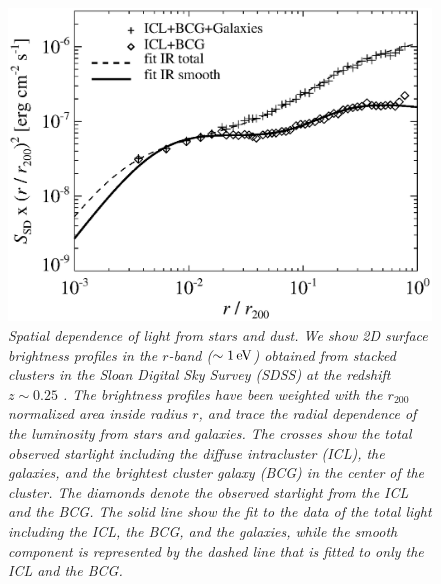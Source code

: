 \documentclass[10pt,aps,pra,reprint,amsmath,amsfonts,amssymb,showpacs]{revtex4-1}
\newcommand{\ev}{\rm{eV}}
\newcommand{\rvir}{r_{200}}
\begin{document}
\begin{figure}%
 \includegraphics[width=0.99\columnwidth]{figures/SB.photon.eps}
\caption{\it Spatial dependence of light from stars and dust. We show
  2D surface brightness profiles in the $r$-band ($\sim 1\,\ev$)
  obtained from stacked clusters in the Sloan Digital Sky Survey
  (SDSS) at the redshift $z \sim 0.25$ \cite{2005MNRAS.358..949Z}. The
  brightness profiles have been weighted with the $\rvir$ normalized
  area inside radius $r$, and trace the radial dependence of the
  luminosity from stars and galaxies. The crosses show the total
  observed starlight including the diffuse intracluster (ICL), the
  galaxies, and the brightest cluster galaxy (BCG) in the center of
  the cluster. The diamonds denote the observed starlight from the
  ICL and the BCG. The solid line show the fit to the data of the
  total light including the ICL, the BCG, and the galaxies, while the
  smooth component is represented by the dashed line that is fitted to
  only the ICL and the BCG.}
 \label{fig:SD_spatial}
\end{figure}
\end{document}
